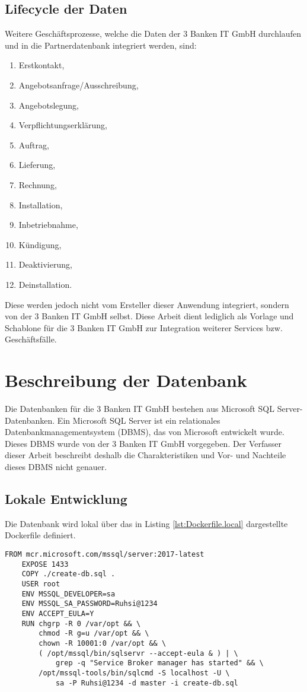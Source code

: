 \subsection{Lifecycle der Daten}
Weitere Geschäftsprozesse, welche die Daten der 3 Banken IT GmbH durchlaufen und in die Partnerdatenbank integriert werden, sind:
\begin{enumerate}
	\item Erstkontakt,
	\item Angebotsanfrage/Ausschreibung,
	\item Angebotslegung,
	\item Verpflichtungserklärung,
	\item Auftrag,
	\item Lieferung,
	\item Rechnung,
	\item Installation,
	\item Inbetriebnahme,
	\item Kündigung,
	\item Deaktivierung,
	\item Deinstallation.
\end{enumerate}

Diese werden jedoch nicht vom Ersteller dieser Anwendung integriert, sondern von der 3 Banken IT GmbH selbst. Diese Arbeit dient lediglich als Vorlage und Schablone für die 3 Banken IT GmbH zur Integration weiterer Services bzw. Geschäftsfälle.

\section{Beschreibung der Datenbank}
Die Datenbanken für die 3 Banken IT GmbH bestehen aus Microsoft SQL Server-Datenbanken. Ein  Microsoft SQL Server ist ein relationales Datenbankmanagementsystem (DBMS), das von Microsoft entwickelt wurde. Dieses DBMS wurde von der 3 Banken IT GmbH vorgegeben. Der Verfasser dieser Arbeit beschreibt deshalb die Charakteristiken und Vor- und Nachteile dieses DBMS nicht genauer.

\subsection{Lokale Entwicklung}
Die Datenbank wird lokal über das in Listing \ref{lst:Dockerfile.local} dargestellte Dockerfile definiert.
\begin{lstlisting}[language=docker, caption=Dockerfile für die lokale Entwicklung, label={lst:Dockerfile.local}]
	FROM mcr.microsoft.com/mssql/server:2017-latest
	EXPOSE 1433
	COPY ./create-db.sql .
	USER root
	ENV MSSQL_DEVELOPER=sa
	ENV MSSQL_SA_PASSWORD=Ruhsi@1234
	ENV ACCEPT_EULA=Y
	RUN chgrp -R 0 /var/opt && \
		chmod -R g=u /var/opt && \
		chown -R 10001:0 /var/opt && \
		( /opt/mssql/bin/sqlservr --accept-eula & ) | \
			grep -q "Service Broker manager has started" && \
		/opt/mssql-tools/bin/sqlcmd -S localhost -U \
			sa -P Ruhsi@1234 -d master -i create-db.sql
\end{lstlisting}

